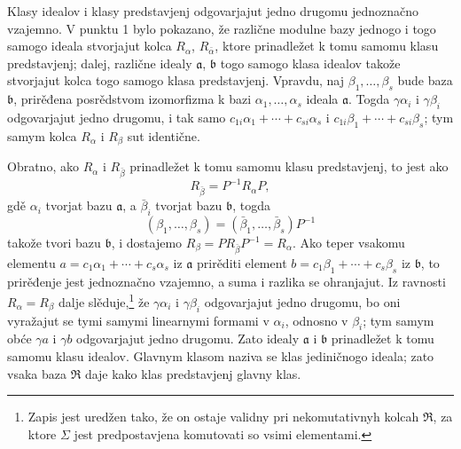 \documentclass[11pt]{article}
\begin{document}
\setcounter{footnote}{25}

Klasy idealov i klasy predstavjenj odgovarjajut jedno drugomu jednoznačno vzajemno. V punktu 1 bylo pokazano, že različne modulne bazy jednogo i togo samogo ideala stvorjajut kolca $R_\alpha$, $R_{\bar\alpha}$, ktore prinadležet k tomu samomu klasu predstavjenj; dalej, različne idealy $\mathfrak a$, $\mathfrak b$ togo samogo klasa idealov takože stvorjajut kolca togo samogo klasa predstavjenj. Vpravdu, naj $\beta_1,\ldots,\beta_s$ bude baza $\mathfrak b$, prirěđena posrědstvom izomorfizma k bazi $\alpha_1,\ldots,\alpha_s$ ideala $\mathfrak a$. Togda $\gamma\alpha_i$ i $\gamma\beta_i$ odgovarjajut jedno drugomu, i tak samo $c_{1i}\alpha_1+\cdots+c_{si}\alpha_s$ i $c_{1i}\beta_1+\cdots+c_{si}\beta_s$; tym samym kolca $R_\alpha$ i $R_\beta$ sut identične.

Obratno, ako $R_\alpha$ i $R_{\bar\beta}$ prinadležet k tomu samomu klasu predstavjenj, to jest ako
\[
        R_{\bar\beta}=P^{-1}R_\alpha P,
\]
gdě $\alpha_i$ tvorjat bazu $\mathfrak a$, a $\bar\beta_i$ tvorjat bazu $\mathfrak b$, togda
\[
        (\beta_1,\ldots,\beta_s)=(\bar\beta_1,\ldots,\bar\beta_s)P^{-1}
\]
takože tvori bazu $\mathfrak b$, i dostajemo $R_\beta=PR_{\bar\beta}P^{-1}=R_\alpha$. Ako teper vsakomu elementu $a=c_1\alpha_1+\cdots+c_s\alpha_s$ iz $\mathfrak a$ prirěditi element $b=c_1\beta_1+\cdots+c_s\beta_s$ iz $\mathfrak b$, to prirěđenje jest jednoznačno vzajemno, a suma i razlika se ohranjajut. Iz ravnosti $R_\alpha=R_\beta$ dalje slěduje,\footnote{Zapis jest uredžen tako, že on ostaje validny pri nekomutativnyh kolcah $\mathfrak R$, za ktore $\Sigma$ jest predpostavjena komutovati so vsimi elementami.} že $\gamma\alpha_i$ i $\gamma\beta_i$ odgovarjajut jedno drugomu, bo oni vyražajut se tymi samymi linearnymi formami v $\alpha_i$, odnosno v $\beta_i$; tym samym obće $\gamma a$ i $\gamma b$ odgovarjajut jedno drugomu. Zato idealy $\mathfrak a$ i $\mathfrak b$ prinadležet k tomu samomu klasu idealov. Glavnym klasom naziva se klas jediničnogo ideala; zato vsaka baza $\mathfrak R$ daje kako klas predstavjenj glavny klas.
\end{document}
